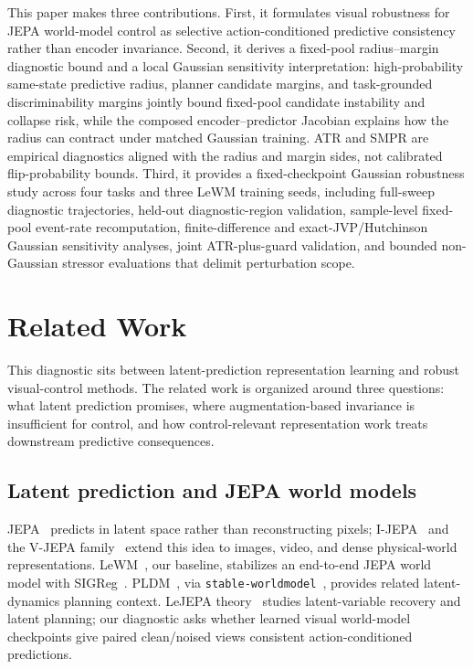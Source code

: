 \documentclass[10pt]{article}
\newcommand{\code}[1]{\texttt{\small #1}}
\begin{document}
This paper makes three contributions. First, it formulates visual robustness for JEPA world-model control as selective action-conditioned predictive consistency rather than encoder invariance. Second, it derives a fixed-pool radius--margin diagnostic bound and a local Gaussian sensitivity interpretation: high-probability same-state predictive radius, planner candidate margins, and task-grounded discriminability margins jointly bound fixed-pool candidate instability and collapse risk, while the composed encoder--predictor Jacobian explains how the radius can contract under matched Gaussian training. ATR and SMPR are empirical diagnostics aligned with the radius and margin sides, not calibrated flip-probability bounds. Third, it provides a fixed-checkpoint Gaussian robustness study across four tasks and three LeWM training seeds, including full-sweep diagnostic trajectories, held-out diagnostic-region validation, sample-level fixed-pool event-rate recomputation, finite-difference and exact-JVP/Hutchinson Gaussian sensitivity analyses, joint ATR-plus-guard validation, and bounded non-Gaussian stressor evaluations that delimit perturbation scope.

\section{Related Work}\label{sec:related}

This diagnostic sits between latent-prediction representation learning and robust visual-control methods. The related work is organized around three questions: what latent prediction promises, where augmentation-based invariance is insufficient for control, and how control-relevant representation work treats downstream predictive consequences.

\subsection{Latent prediction and JEPA world models}
JEPA~\cite{lecun2022path} predicts in latent space rather than reconstructing pixels; I-JEPA~\cite{assran2023ijepa} and the V-JEPA family~\cite{bardes2024vjepa,assran2025vjepa2,murlabadia2026vjepa21} extend this idea to images, video, and dense physical-world representations. LeWM~\cite{maes2026lewm}, our baseline, stabilizes an end-to-end JEPA world model with SIGReg~\cite{eppspulley1983}. PLDM~\cite{sobal2022jointembeddingpredictivearchitectures,sobal2025stresstesting}, via \code{stable-worldmodel}~\cite{maes2026stableworldmodel}, provides related latent-dynamics planning context. LeJEPA theory~\cite{klindt2026lejepaworldmodel} studies latent-variable recovery and latent planning; our diagnostic asks whether learned visual world-model checkpoints give paired clean/noised views consistent action-conditioned predictions.
\end{document}
